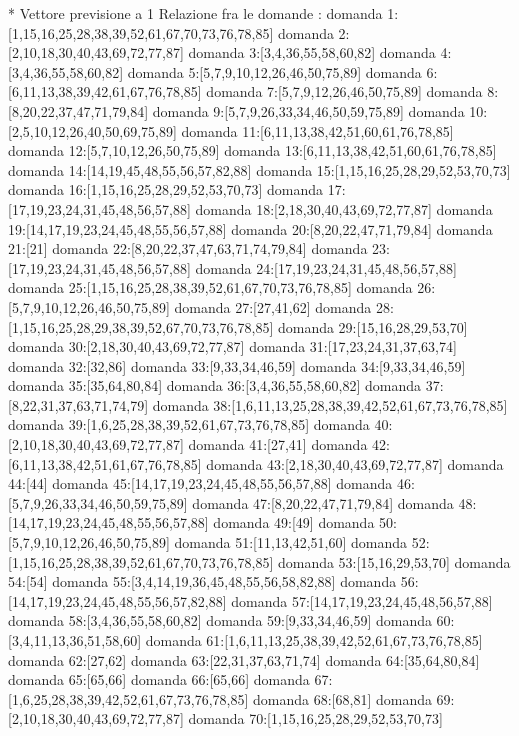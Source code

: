 * Vettore previsione a 1
Relazione fra le domande :
domanda 1:[1,15,16,25,28,38,39,52,61,67,70,73,76,78,85]
domanda 2:[2,10,18,30,40,43,69,72,77,87]
domanda 3:[3,4,36,55,58,60,82]
domanda 4:[3,4,36,55,58,60,82]
domanda 5:[5,7,9,10,12,26,46,50,75,89]
domanda 6:[6,11,13,38,39,42,61,67,76,78,85]
domanda 7:[5,7,9,12,26,46,50,75,89]
domanda 8:[8,20,22,37,47,71,79,84]
domanda 9:[5,7,9,26,33,34,46,50,59,75,89]
domanda 10:[2,5,10,12,26,40,50,69,75,89]
domanda 11:[6,11,13,38,42,51,60,61,76,78,85]
domanda 12:[5,7,10,12,26,50,75,89]
domanda 13:[6,11,13,38,42,51,60,61,76,78,85]
domanda 14:[14,19,45,48,55,56,57,82,88]
domanda 15:[1,15,16,25,28,29,52,53,70,73]
domanda 16:[1,15,16,25,28,29,52,53,70,73]
domanda 17:[17,19,23,24,31,45,48,56,57,88]
domanda 18:[2,18,30,40,43,69,72,77,87]
domanda 19:[14,17,19,23,24,45,48,55,56,57,88]
domanda 20:[8,20,22,47,71,79,84]
domanda 21:[21]
domanda 22:[8,20,22,37,47,63,71,74,79,84]
domanda 23:[17,19,23,24,31,45,48,56,57,88]
domanda 24:[17,19,23,24,31,45,48,56,57,88]
domanda 25:[1,15,16,25,28,38,39,52,61,67,70,73,76,78,85]
domanda 26:[5,7,9,10,12,26,46,50,75,89]
domanda 27:[27,41,62]
domanda 28:[1,15,16,25,28,29,38,39,52,67,70,73,76,78,85]
domanda 29:[15,16,28,29,53,70]
domanda 30:[2,18,30,40,43,69,72,77,87]
domanda 31:[17,23,24,31,37,63,74]
domanda 32:[32,86]
domanda 33:[9,33,34,46,59]
domanda 34:[9,33,34,46,59]
domanda 35:[35,64,80,84]
domanda 36:[3,4,36,55,58,60,82]
domanda 37:[8,22,31,37,63,71,74,79]
domanda 38:[1,6,11,13,25,28,38,39,42,52,61,67,73,76,78,85]
domanda 39:[1,6,25,28,38,39,52,61,67,73,76,78,85]
domanda 40:[2,10,18,30,40,43,69,72,77,87]
domanda 41:[27,41]
domanda 42:[6,11,13,38,42,51,61,67,76,78,85]
domanda 43:[2,18,30,40,43,69,72,77,87]
domanda 44:[44]
domanda 45:[14,17,19,23,24,45,48,55,56,57,88]
domanda 46:[5,7,9,26,33,34,46,50,59,75,89]
domanda 47:[8,20,22,47,71,79,84]
domanda 48:[14,17,19,23,24,45,48,55,56,57,88]
domanda 49:[49]
domanda 50:[5,7,9,10,12,26,46,50,75,89]
domanda 51:[11,13,42,51,60]
domanda 52:[1,15,16,25,28,38,39,52,61,67,70,73,76,78,85]
domanda 53:[15,16,29,53,70]
domanda 54:[54]
domanda 55:[3,4,14,19,36,45,48,55,56,58,82,88]
domanda 56:[14,17,19,23,24,45,48,55,56,57,82,88]
domanda 57:[14,17,19,23,24,45,48,56,57,88]
domanda 58:[3,4,36,55,58,60,82]
domanda 59:[9,33,34,46,59]
domanda 60:[3,4,11,13,36,51,58,60]
domanda 61:[1,6,11,13,25,38,39,42,52,61,67,73,76,78,85]
domanda 62:[27,62]
domanda 63:[22,31,37,63,71,74]
domanda 64:[35,64,80,84]
domanda 65:[65,66]
domanda 66:[65,66]
domanda 67:[1,6,25,28,38,39,42,52,61,67,73,76,78,85]
domanda 68:[68,81]
domanda 69:[2,10,18,30,40,43,69,72,77,87]
domanda 70:[1,15,16,25,28,29,52,53,70,73]
